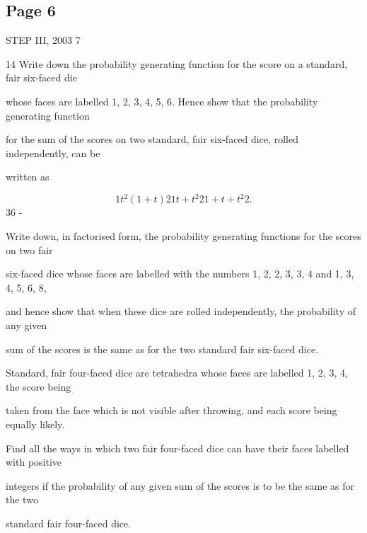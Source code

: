 \documentclass[12pt]{article}
\begin{document}
\subsection*{Page 6}
\begin{flushleft}
STEP III, 2003 7\par
14 Write down the probability generating function for the score on a standard, fair six-faced die\par
whose faces are labelled 1, 2, 3, 4, 5, 6. Hence show that the probability generating function\par
for the sum of the scores on two standard, fair six-faced dice, rolled independently, can be\par
written as\par
\[1 t^2 (1 + t) 2 1 t + t^2 2 1 + t + t^2 2 .\]
36 -\par
Write down, in factorised form, the probability generating functions for the scores on two fair\par
six-faced dice whose faces are labelled with the numbers 1, 2, 2, 3, 3, 4 and 1, 3, 4, 5, 6, 8,\par
and hence show that when these dice are rolled independently, the probability of any given\par
sum of the scores is the same as for the two standard fair six-faced dice.\par
Standard, fair four-faced dice are tetrahedra whose faces are labelled 1, 2, 3, 4, the score being\par
taken from the face which is not visible after throwing, and each score being equally likely.\par
Find all the ways in which two fair four-faced dice can have their faces labelled with positive\par
integers if the probability of any given sum of the scores is to be the same as for the two\par
standard fair four-faced dice.\par
\end{flushleft}
\end{document}
